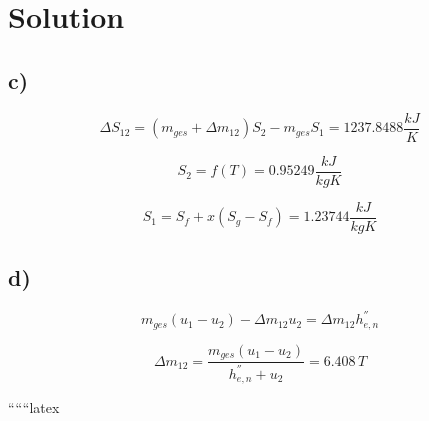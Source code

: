 \section*{Solution}

\subsection*{c)}

\begin{equation*}
\Delta S_{12} = \left( m_{ges} + \Delta m_{12} \right) S_2 - m_{ges} S_1 = 1237.8488 \frac{kJ}{K}
\end{equation*}

\begin{equation*}
S_2 = f \left( T \right) = 0.95249 \frac{kJ}{kgK}
\end{equation*}

\begin{equation*}
S_1 = S_f + x \left( S_g - S_f \right) = 1.23744 \frac{kJ}{kgK}
\end{equation*}

\subsection*{d)}

\begin{equation*}
m_{ges} \left( u_1 - u_2 \right) - \Delta m_{12} u_2 = \Delta m_{12} h_{e,n}^{''}
\end{equation*}

\begin{equation*}
\Delta m_{12} = \frac{m_{ges} \left( u_1 - u_2 \right)}{h_{e,n}^{''} + u_2} = 6.408 \, T
\end{equation*}

``````latex


